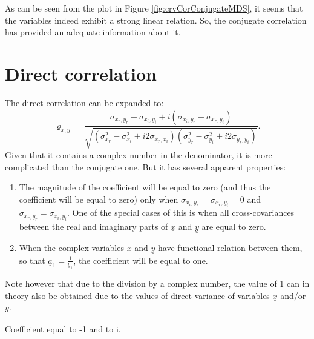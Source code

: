 \documentclass[
]{book}
\begin{document}
As can be seen from the plot in Figure \ref{fig:crvCorConjugateMDS}, it seems that the variables indeed exhibit a strong linear relation. So, the conjugate correlation has provided an adequate information about it.

\hypertarget{correlationDirect}{%
\section{Direct correlation}\label{correlationDirect}}

The direct correlation can be expanded to:
\begin{equation}
    {\varrho}_{x,y} = \frac{\sigma_{x_r, y_r} - \sigma_{x_i, y_i} + i (\sigma_{x_i, y_r} + \sigma_{x_r, y_i})}{\sqrt{(\sigma_{x_r}^2 - \sigma_{x_i}^2 + i2 \sigma_{x_r,x_i})(\sigma_{y_r}^2 - \sigma_{y_i}^2 + i2 \sigma_{y_r,y_i})}}.
    \label{eq:correlationPseudoExpanded}
\end{equation}
Given that it contains a complex number in the denominator, it is more complicated than the conjugate one. But it has several apparent properties:

\begin{enumerate}
\def\labelenumi{\arabic{enumi}.}
\item
  The magnitude of the coefficient will be equal to zero (and thus the coefficient will be equal to zero) only when \(\sigma_{x_i,y_r}=\sigma_{x_r,y_i}=0\) and \(\sigma_{x_r,y_r}=\sigma_{x_i,y_i}\). One of the special cases of this is when all cross-covariances between the real and imaginary parts of \(\underline{x}\) and \(\underline{y}\) are equal to zero.
\item
  When the complex variables \(\underline{x}\) and \(\underline{y}\) have functional relation between them, so that \(\underline{a}_1 = \frac{1}{\underline{b}_1}\), the coefficient will be equal to one.
\end{enumerate}

Note however that due to the division by a complex number, the value of 1 can in theory also be obtained due to the values of direct variance of variables \(\underline{x}\) and/or \(\underline{y}\).

Coefficient equal to -1 and to i.
\end{document}
